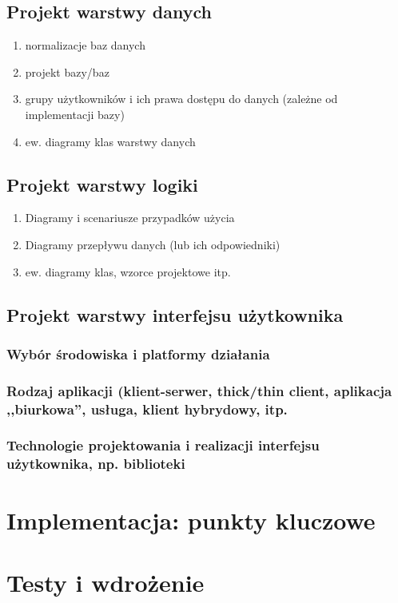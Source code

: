 \documentclass[12pt]{report}
\begin{document}
\subsection{Projekt warstwy danych}

\begin{enumerate}
\item normalizacje baz danych
\item projekt bazy/baz 
\item grupy użytkowników i ich prawa dostępu do danych (zależne od implementacji bazy)
\item ew. diagramy klas warstwy danych
\end{enumerate}
\subsection{Projekt warstwy logiki}
\begin{enumerate}
\item Diagramy i scenariusze przypadków użycia
\item Diagramy przepływu danych (lub ich odpowiedniki)
\item ew. diagramy klas, wzorce projektowe itp.
\end{enumerate}

\subsection{Projekt warstwy interfejsu użytkownika}
\subsubsection{Wybór środowiska i platformy działania}
\subsubsection{Rodzaj aplikacji (klient-serwer, thick/thin client, aplikacja
,,biurkowa'', usługa, klient hybrydowy, itp.}
\subsubsection{Technologie projektowania i realizacji interfejsu użytkownika,
np. biblioteki}


\section{Implementacja: punkty kluczowe}

\section{Testy i wdrożenie}
\end{document}
